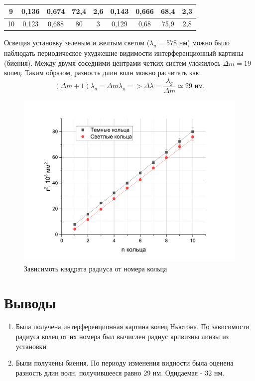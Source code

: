 \documentclass[a4paper, 12pt]{article}
\begin{document}
\begin{table}[h!]
\begin{center}
\begin{tabular}{|c|c|c|c|c|c|c|c|c|}
9                      & 0,136  & 0,674  & 72,4                     & 2,6                               & 0,143 & 0,666 & 68,4                     & 2,3                               \\ \hline
10                     & 0,123  & 0,688  & 80                       & 3                                 & 0,129 & 0,68  & 75,9                     & 2,8                               \\ \hline
\end{tabular}
\end{center}
\end{table}



Освещая установку зеленым и желтым светом ($\lambda_y$ = 578 нм) можно было наблюдать периодическое ухуджешие видимости интерференционный картины (биения). Между двумя соседними центрами четких систем уложилось $ \Delta m =  19 $ колец. Таким образом, разность длин волн можно расчитать как:
$$
	(\Delta m + 1)\lambda_g = \Delta m \lambda_y => \Delta \lambda = \dfrac{\lambda_g}{\Delta m} \simeq 29\text{ нм}.
$$

\newpage
\begin{figure}[h!]
    \begin{center}
    \includegraphics[width=1\textwidth]{graph1.png}
    \end{center}
    \caption{Зависимоть квадрата радиуса от номера кольца}
\end{figure}


 \section{Выводы}
\begin{enumerate}
    \item Была получена интерференционная картина колец Ньютона. По зависимости радиуса колец от их номера был вычислен радиус кривизны линзы из установки
    \item Были получены биения. По периоду изменения видности была оценена разность длин волн, получившееся равно 29 нм. Одидаемая - 32 нм.

\end{enumerate}
\end{document}
